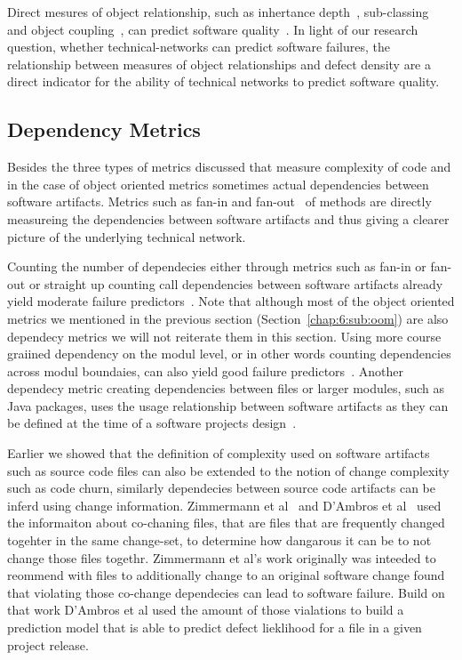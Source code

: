 Direct mesures of object relationship, such as inhertance depth~\cite{chidamber:tse:1994}, sub-classing~\cite{chidamber:tse:1994} and object coupling~\cite{chidamber:tse:1994}, can predict software quality~\cite{nagappan:icse:2006,arisholm:isese:2006,english:promise:2009}.
In light of our research question, whether technical-networks can predict software failures, the relationship between measures of object relationships and defect density are a direct indicator for the ability of technical networks to predict software quality.


\subsection{Dependency Metrics}
\label{chap:6:sub:depmet}
Besides the three types of metrics discussed that measure complexity of code and in the case of object oriented metrics sometimes actual dependencies between software artifacts.
Metrics such as fan-in and fan-out~\cite{henry:tse:1981} of methods are directly measureing the dependencies between software artifacts and thus giving a clearer picture of the underlying technical network.

Counting the number of dependecies either through metrics such as fan-in or fan-out or straight up counting call dependencies between software artifacts already yield moderate failure predictors~\cite{cataldo:icse:2011,nagappan:icse:2006,arisholm:isese:2006,knab:msr:2006,shin:msr:2009}.
Note that although most of the object oriented metrics we mentioned in the previous section (Section~\ref{chap:6:sub:oom}) are also dependecy metrics we will not reiterate them in this section. 
Using more course graiined dependency on the modul level, or in other words counting dependencies across modul boundaies, can also yield good failure predictors~\cite{jiang:promise:2008}.
Another dependecy metric creating dependencies between files or larger modules, such as Java packages, uses the usage relationship between software artifacts as they can be defined at the time of a software projects design~\cite{schroeter:isese:2006,dualaekoko:esem:2009}.

Earlier we showed that the definition of complexity used on software artifacts such as source code files can also be extended to the notion of change complexity such as code churn, similarly dependecies between source code artifacts can be inferd using change information.
Zimmermann et al~\cite{zimmermann:icse:2004} and D'Ambros et al~\cite{dambros:wcre:2009} used the informaiton about co-chaning files, that are files that are frequently changed togehter in the same change-set, to determine how dangarous it can be to not change those files togethr.
Zimmermann et al's work originally was inteeded to reommend with files to additionally change to an original software change  found that violating those co-change dependecies can lead to software failure.
Build on that work D'Ambros et al used the amount of those vialations to build a prediction model that is able to predict defect lieklihood for a file in a given project release. 


